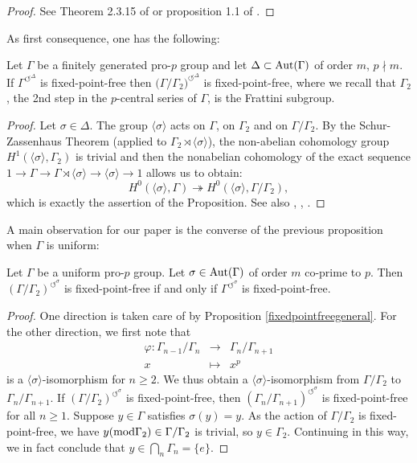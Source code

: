 \documentclass[12pt,a4paper,twoside,english]{smfart}
\def\Aut{{\rm Aut}}
\def\mod{{\rm mod}}
\def\ACT#1#2{{\displaystyle{#1^{\circlearrowleft^#2}}}}
\def\act#1{{\displaystyle{#1^{\circlearrowleft^\sigma}}}}
\begin{document}
  
\begin{proof}
 See Theorem 2.3.15 of \cite{RZ} or proposition  1.1 of \cite{GHR}.
  \end{proof}
 
 As first consequence, one has the following:
 
 \begin{prop}\label{fixedpointfreegeneral}
Let $\Gamma$ be a finitely generated pro-$p$ group and let $\Delta \subset \Aut(\Gamma)$ of order $m$, $p\nmid m$.
 If $\ACT{\Gamma}{\Delta}$ is fixed-point-free  then $\ACT{\big(\Gamma/\Gamma_2\big)}{\Delta}$ is fixed-point-free, where we recall that $\Gamma_2$, the 2nd step in the $p$-central series of $\Gamma$, is the Frattini subgroup.
 \end{prop}

\begin{proof}  Let $\sigma \in \Delta$. The group $\langle \sigma \rangle$ acts on $\Gamma$, on  $\Gamma_2$ and on $\Gamma/\Gamma_2$. 
 By the Schur-Zassenhaus Theorem (applied to $\Gamma_2 \rtimes \langle \sigma \rangle$),
the non-abelian cohomology group  $H^1(\langle \sigma \rangle,\Gamma_2)$ is trivial and then the nonabelian cohomology of the exact sequence $1\longrightarrow \Gamma \longrightarrow \Gamma \rtimes \langle \sigma \rangle \longrightarrow \langle \sigma \rangle  \longrightarrow 1$ allows us to obtain: $$H^0(\langle \sigma \rangle ,\Gamma)\twoheadrightarrow H^0(\langle \sigma \rangle,\Gamma/\Gamma_2),$$
which is exactly the assertion of the Proposition. 
  See also   \cite{Boston},  \cite{Greenberg}, \cite{wingberg}.
\end{proof}


 
A main observation for our paper is the converse of the previous proposition when $\Gamma$ is uniform:
  
 \begin{prop}\label{actionuniforme} Let $\Gamma$ be a uniform pro-$p$ group.
  Let $\sigma \in  \Aut(\Gamma)$  of order $m$ co-prime to $p$.
  Then $\ACT{(\Gamma/\Gamma_2)}{\sigma}$ is fixed-point-free if and only if   $\ACT{\Gamma}{\sigma}$ is fixed-point-free.
 \end{prop}

 \begin{proof}One direction is taken care of by Proposition \ref{fixedpointfreegeneral}. For the other direction, we first note that
  $$\begin{array}{rcl}  \varphi  : \Gamma_{n-1}/\Gamma_n & \rightarrow &\Gamma_n/\Gamma_{n+1} \\
  x & \mapsto  & x^p
 \end{array}$$
 is a $\langle \sigma \rangle$-isomorphism for $n\geq 2$.  We thus obtain a $\langle \sigma \rangle$-isomorphism from $\Gamma/\Gamma_2$ to $\Gamma_{n}/\Gamma_{n+1}$.
 If $\act{(\Gamma/\Gamma_2)}$ is fixed-point-free, then $\act{(\Gamma_n/\Gamma_{n+1})}$ is fixed-point-free for all $n\geq 1$.
Suppose $y \in \Gamma$ satisfies $\sigma(y)=y$. As the action of $\Gamma/\Gamma_2$ is fixed-point-free, we have $ y (\mod \Gamma_2) \in  \Gamma/\Gamma_2$ is trivial, so $y\in \Gamma_2$. Continuing in this way, we in fact conclude that 
 $\displaystyle{y\in \bigcap_n \Gamma_n=\{e\}}$.
 \end{proof}
  
\end{document}
